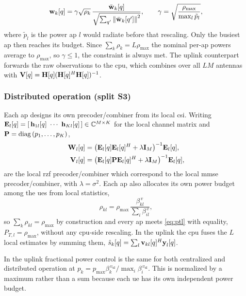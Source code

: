 \begin{equation}
\label{eq:power-normalization}
\boldsymbol{\mathrm{w}}_{k}[q] = \gamma\sqrt{\rho_{k}}\,
\frac{\bar{\boldsymbol{\mathrm{w}}}_{k}[q]}{\sqrt{\sum_{q'}\left\lVert\bar{\boldsymbol{\mathrm{w}}}_{k}[q']\right\rVert^{2}}},
\qquad
\gamma = \sqrt{\frac{\rho_{\max}}{\max_{l}\tilde{p}_{l}}},
\end{equation}
where $\tilde p_{l}$ is the power \gls{ap} $l$ would radiate before that
rescaling. Only the busiest \gls{ap} then reaches its budget. Since
$\sum_{k}\rho_{k}=L\rho_{\max}$ the nominal per-\gls{ap} powers average to
$\rho_{\max}$, so $\gamma\leq 1$, the constraint is always met. The uplink counterpart forwards the raw
observations to the \gls{cpu}, which combines over all $LM$ antennas with
$\boldsymbol{\mathrm{V}}[q]=\boldsymbol{\mathrm{H}}[q](\boldsymbol{\mathrm{H}}[q]^{H}\boldsymbol{\mathrm{H}}[q])^{-1}$. 

\subsubsection{Distributed operation (split S3)}
Each \gls{ap} designs its own precoder/combiner from its local \gls{csi}. Writing $\boldsymbol{\mathrm{E}}_{l}[q]=[\,\boldsymbol{\mathrm{h}}_{1l}[q]\ \cdots\
\boldsymbol{\mathrm{h}}_{Kl}[q]\,]\in\mathbb{C}^{M\times K}$ for the local channel matrix and
$\boldsymbol{\mathrm{P}}=\mathrm{diag}\left(p_{1},\dots,p_{K}\right)$,
\begin{align}
\label{eq:local-rzf}
\boldsymbol{\mathrm{W}}_{l}[q] &= \big(\boldsymbol{\mathrm{E}}_{l}[q]\boldsymbol{\mathrm{E}}_{l}[q]^{H}
+ \lambda\boldsymbol{\mathrm{I}}_{M}\big)^{-1}\boldsymbol{\mathrm{E}}_{l}[q], \\
\label{eq:ul-local-mmse}
\boldsymbol{\mathrm{V}}_{l}[q] &= \big(\boldsymbol{\mathrm{E}}_{l}[q]\boldsymbol{\mathrm{P}}\boldsymbol{\mathrm{E}}_{l}[q]^{H}
+ \lambda\boldsymbol{\mathrm{I}}_{M}\big)^{-1}\boldsymbol{\mathrm{E}}_{l}[q],
\end{align}
are the local \gls{rzf} precoder/combiner which correspond to the local \gls{mmse} precoder/combiner, with $\lambda=\sigma^{2}$. Each \gls{ap} also allocates its own power budget among the \glspl{ue} from local statistics,
\begin{equation}
\label{eq:local-fractional}
\rho_{kl} = \rho_{\max}\,\frac{\beta_{kl}^{\,v}}{\sum_{i}\beta_{il}^{\,v}},
\end{equation}
so $\sum_{k}\rho_{kl}=\rho_{\max}$ by construction and every \gls{ap} meets
\eqref{eq:ptl} with equality, $P_{T,l}=\rho_{\max}$, without any
\gls{cpu}-side rescaling. In
the uplink the \gls{cpu} fuses the $L$ local estimates by summing them,
$\hat s_{k}[q]=\sum_{l}\boldsymbol{\mathrm{v}}_{kl}[q]^{H}\boldsymbol{\mathrm{y}}_{l}[q]$.

In the uplink fractional power control is the same for both centralized and distributed operation at $p_{k}=p_{\max}\beta_{k}^{\,v_{\mathrm{ul}}}/\max_{i}\beta_{i}^{\,v_{\mathrm{ul}}}$. This is normalized by a maximum rather than a sum because each \gls{ue} has its own independent power budget.


